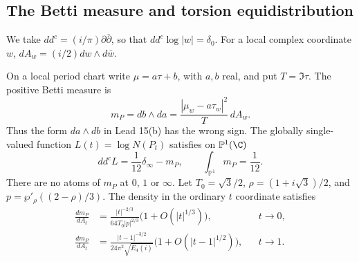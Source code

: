 
\subsection{The Betti measure and torsion equidistribution}

We take $dd^c=(i/\pi)\partial\bar\partial$, so that
$dd^c\log|w|=\delta_0$. For a local complex coordinate $w$,
$dA_w=(i/2)dw\wedge d\bar w$.

\begin{proposition}\label{ari:C.8.9}
On a local period chart write $\mu=a\tau+b$, with $a,b$ real,
and put $T=\Im\tau$. The positive Betti measure is
\[
 m_P=db\wedge da
 =\frac{|\mu_w-a\tau_w|^2}{T}\,dA_w.
\]
Thus the form $da\wedge db$ in Lead 15(b) has the wrong sign.
The globally single-valued function $L(t)=\log N(P_t)$ satisfies
on $\mathbb P^1(\C)$
\begin{equation}\label{ari:eq:ca-current}
 dd^cL=\frac1{12}\delta_\infty-m_P,\qquad
               \int_{\mathbb P^1}m_P=\frac1{12}.
\end{equation}
There are no atoms of $m_P$ at $0$, $1$ or $\infty$.
Let $T_0=\sqrt3/2$, $\rho=(1+i\sqrt3)/2$, and
$p=\wp'_\rho((2-\rho)/3)$. The density in the ordinary
$t$ coordinate satisfies
\begin{align}
 \frac{dm_P}{dA_t}
 &=\frac{|t|^{-2/3}}{64T_0|p|^{2/3}}
                      \bigl(1+O(|t|^{1/3})\bigr),
                         &&t\longrightarrow0,\label{ari:eq:ca-density0}\\
 \frac{dm_P}{dA_t}
 &=\frac{|t-1|^{-3/2}}{24\pi^2\sqrt{E_4(i)}}
                      \bigl(1+O(|t-1|^{1/2})\bigr),
                         &&t\longrightarrow1.\label{ari:eq:ca-density1}
\end{align}
\end{proposition}

